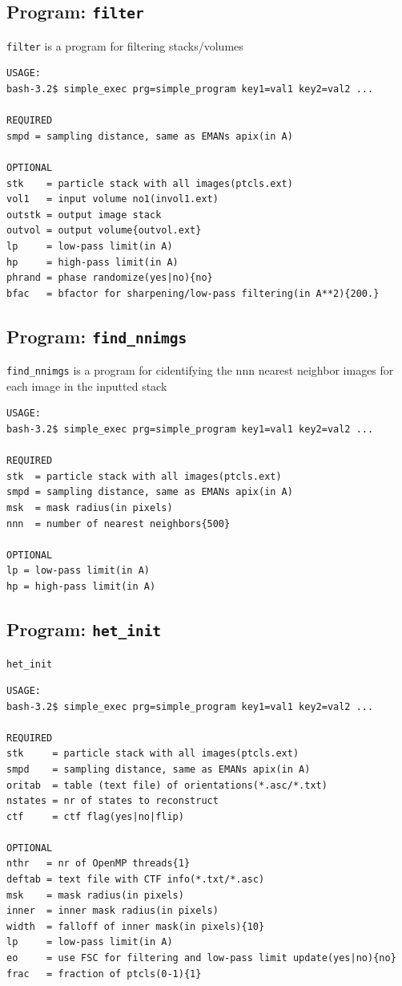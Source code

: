 \documentclass[a4paper,11pt]{article}
\newcommand{\prgname}[1]{\textcolor{NavyBlue}{\texttt{#1}}}
\begin{document}
\subsection{Program: \prgname{filter}}
\label{filter}
\prgname{filter} is a program for filtering stacks/volumes 

\begin{verbatim}
USAGE:
bash-3.2$ simple_exec prg=simple_program key1=val1 key2=val2 ...

REQUIRED
smpd = sampling distance, same as EMANs apix(in A)

OPTIONAL
stk    = particle stack with all images(ptcls.ext)
vol1   = input volume no1(invol1.ext)
outstk = output image stack
outvol = output volume{outvol.ext}
lp     = low-pass limit(in A)
hp     = high-pass limit(in A)
phrand = phase randomize(yes|no){no}
bfac   = bfactor for sharpening/low-pass filtering(in A**2){200.}
\end{verbatim}

\subsection{Program: \prgname{find\_nnimgs}}
\label{find_nnimgs}
\prgname{find\_nnimgs} is a program for cidentifying the nnn nearest neighbor images for each image in the inputted stack

\begin{verbatim}
USAGE:
bash-3.2$ simple_exec prg=simple_program key1=val1 key2=val2 ...

REQUIRED
stk  = particle stack with all images(ptcls.ext)
smpd = sampling distance, same as EMANs apix(in A)
msk  = mask radius(in pixels)
nnn  = number of nearest neighbors{500}

OPTIONAL
lp = low-pass limit(in A)
hp = high-pass limit(in A)
\end{verbatim}

\subsection{Program: \prgname{het\_init}}
\label{het_init}
\prgname{het\_init}  

\begin{verbatim}
USAGE:
bash-3.2$ simple_exec prg=simple_program key1=val1 key2=val2 ...

REQUIRED
stk     = particle stack with all images(ptcls.ext)
smpd    = sampling distance, same as EMANs apix(in A)
oritab  = table (text file) of orientations(*.asc/*.txt)
nstates = nr of states to reconstruct
ctf     = ctf flag(yes|no|flip)

OPTIONAL
nthr   = nr of OpenMP threads{1}
deftab = text file with CTF info(*.txt/*.asc)
msk    = mask radius(in pixels)
inner  = inner mask radius(in pixels)
width  = falloff of inner mask(in pixels){10}
lp     = low-pass limit(in A)
eo     = use FSC for filtering and low-pass limit update(yes|no){no}
frac   = fraction of ptcls(0-1){1}
\end{verbatim}
\end{document}
